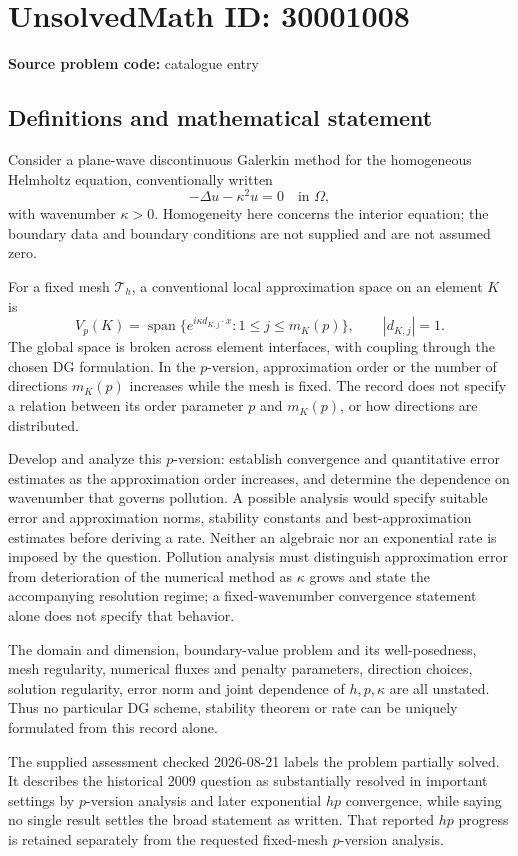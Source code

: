 \documentclass[11pt]{article}
\begin{document}
\section*{UnsolvedMath ID: 30001008}
\textbf{Source problem code:} catalogue entry
\subsection{Definitions and mathematical statement}
Consider a plane-wave discontinuous Galerkin method for the homogeneous Helmholtz equation, conventionally written
\[
-\Delta u-\kappa^2u=0\quad\text{in }\Omega,
\]
with wavenumber $\kappa>0$. Homogeneity here concerns the interior equation; the boundary data and boundary conditions are not supplied and are not assumed zero.

For a fixed mesh $\mathcal T_h$, a conventional local approximation space on an element $K$ is
\[
V_p(K)=\operatorname{span}\{e^{i\kappa d_{K,j}\cdot x}:1\leq j\leq m_K(p)\},
\qquad |d_{K,j}|=1.
\]
The global space is broken across element interfaces, with coupling through the chosen DG formulation. In the $p$-version, approximation order or the number of directions $m_K(p)$ increases while the mesh is fixed. The record does not specify a relation between its order parameter $p$ and $m_K(p)$, or how directions are distributed.

Develop and analyze this $p$-version: establish convergence and quantitative error estimates as the approximation order increases, and determine the dependence on wavenumber that governs pollution. A possible analysis would specify suitable error and approximation norms, stability constants and best-approximation estimates before deriving a rate. Neither an algebraic nor an exponential rate is imposed by the question. Pollution analysis must distinguish approximation error from deterioration of the numerical method as $\kappa$ grows and state the accompanying resolution regime; a fixed-wavenumber convergence statement alone does not specify that behavior.

The domain and dimension, boundary-value problem and its well-posedness, mesh regularity, numerical fluxes and penalty parameters, direction choices, solution regularity, error norm and joint dependence of $h,p,\kappa$ are all unstated. Thus no particular DG scheme, stability theorem or rate can be uniquely formulated from this record alone.

The supplied assessment checked 2026-08-21 labels the problem partially solved. It describes the historical 2009 question as substantially resolved in important settings by $p$-version analysis and later exponential $hp$ convergence, while saying no single result settles the broad statement as written. That reported $hp$ progress is retained separately from the requested fixed-mesh $p$-version analysis.
\end{document}
